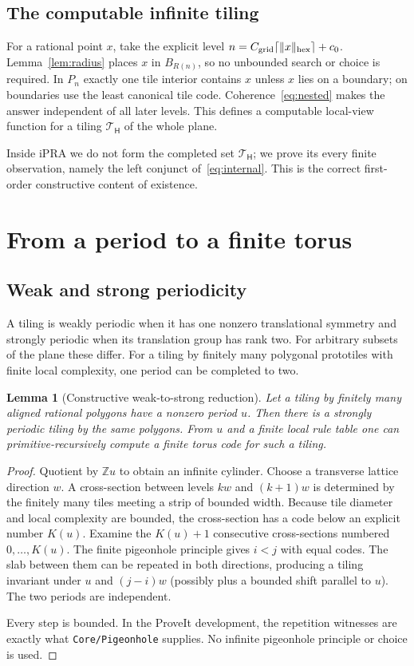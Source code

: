 \documentclass[11pt]{article}
\newtheorem{lemma}[theorem]{Lemma}
\newcommand{\iPRA}{\mathrm{iPRA}}
\newcommand{\Z}{\mathbb Z}
\newcommand{\Htile}{\mathsf H}
\begin{document}
\subsection{The computable infinite tiling}
For a rational point $x$, take the explicit level
$n=C_{\rm grid}\lceil\|x\|_{\mathrm{hex}}\rceil+c_0$.  Lemma~\ref{lem:radius}
places $x$ in $B_{R(n)}$, so no unbounded search or choice is required.  In $P_n$ exactly one tile interior contains $x$ unless $x$ lies on a boundary;
on boundaries use the least canonical tile code.  Coherence~\eqref{eq:nested} makes the
answer independent of all later levels.  This defines a computable local-view function
for a tiling $\mathcal T_\Htile$ of the whole plane.

Inside $\iPRA$ we do not form the completed set $\mathcal T_\Htile$; we prove its every
finite observation, namely the left conjunct of~\eqref{eq:internal}.  This is the correct
first-order constructive content of existence.

\section{From a period to a finite torus}

\subsection{Weak and strong periodicity}
A tiling is weakly periodic when it has one nonzero translational symmetry and strongly
periodic when its translation group has rank two.  For arbitrary subsets of the plane
these differ.  For a tiling by finitely many polygonal prototiles with finite local
complexity, one period can be completed to two.

\begin{lemma}[Constructive weak-to-strong reduction]\label{lem:weakstrong}
Let a tiling by finitely many aligned rational polygons have a nonzero period $u$.  Then
there is a strongly periodic tiling by the same polygons.  From $u$ and a finite local
rule table one can primitive-recursively compute a finite torus code for such a tiling.
\end{lemma}

\begin{proof}
Quotient by $\Z u$ to obtain an infinite cylinder.  Choose a transverse lattice direction
$w$.  A cross-section between levels $kw$ and $(k+1)w$ is determined by the finitely many
tiles meeting a strip of bounded width.  Because tile diameter and local complexity are
bounded, the cross-section has a code below an explicit number $K(u)$.  Examine the
$K(u)+1$ consecutive cross-sections numbered $0,\dots,K(u)$.  The finite pigeonhole
principle gives $i<j$ with equal codes.  The slab between them can be repeated in both
directions, producing a tiling invariant under $u$ and $(j-i)w$ (possibly plus a bounded
shift parallel to $u$).  The two periods are independent.

Every step is bounded.  In the ProveIt development, the repetition witnesses are exactly
what \texttt{Core/Pigeonhole} supplies.  No infinite pigeonhole principle or choice is
used.
\end{proof}
\end{document}
